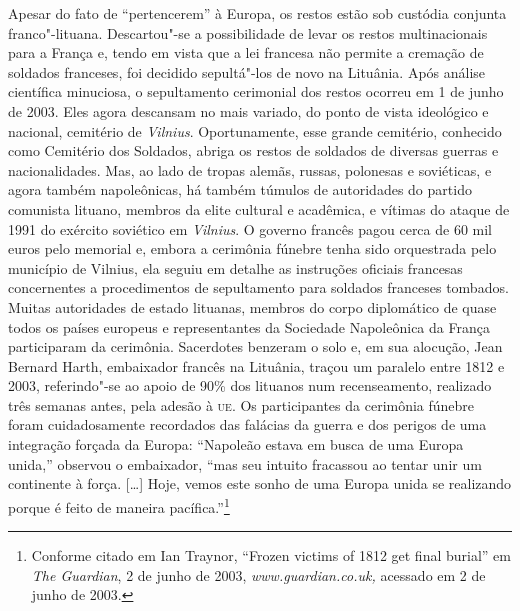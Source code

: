 Apesar do fato de ``pertencerem'' à Europa, os restos estão sob custódia
conjunta franco"-lituana. Descartou"-se a possibilidade de levar os restos
multinacionais para a França e, tendo em vista que a lei francesa não
permite a cremação de soldados franceses, foi decidido sepultá"-los de
novo na Lituânia. Após análise científica minuciosa, o sepultamento
cerimonial dos restos ocorreu em 1 de junho de 2003. Eles agora
descansam no mais variado, do ponto de vista ideológico e nacional,
cemitério de \textit{Vilnius}. Oportunamente, esse grande cemitério, conhecido
como Cemitério dos Soldados, abriga os restos de soldados de diversas
guerras e nacionalidades. Mas, ao lado de tropas alemãs, russas,
polonesas e soviéticas, e agora também napoleônicas, há também túmulos
de autoridades do partido comunista lituano, membros da elite cultural e
acadêmica, e vítimas do ataque de 1991 do exército soviético em \textit{Vilnius}.
O governo francês pagou cerca de 60 mil euros pelo memorial e,
embora a cerimônia fúnebre tenha sido orquestrada pelo município de
Vilnius, ela seguiu em detalhe as instruções oficiais francesas
concernentes a procedimentos de sepultamento para soldados franceses
tombados. Muitas autoridades de estado lituanas, membros do corpo
diplomático de quase todos os países europeus e representantes da
Sociedade Napoleônica da França participaram da cerimônia. Sacerdotes
benzeram o solo e, em sua alocução, Jean Bernard Harth, embaixador
francês na Lituânia, traçou um paralelo entre 1812 e 2003, referindo"-se
ao apoio de 90\% dos lituanos num recenseamento, realizado
três semanas antes, pela adesão à \textsc{ue}. Os participantes da cerimônia
fúnebre foram cuidadosamente recordados das falácias da guerra e dos
perigos de uma integração forçada da Europa: ``Napoleão estava em busca
de uma Europa unida,'' observou o embaixador, ``mas seu intuito
fracassou ao tentar unir um continente à força. [\ldots{}] Hoje, vemos
este sonho de uma Europa unida se realizando porque é feito de maneira
pacífica.''\footnote{Conforme citado em Ian Traynor, ``Frozen victims of 1812 get final burial'' em \textit{The Guardian}, 2 de junho de 2003, \textit{www.guardian.co.uk,} acessado em 2 de junho de 2003.}

